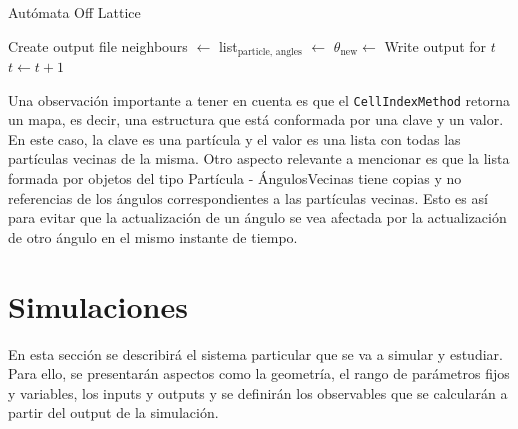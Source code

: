\documentclass[11pt, a4paper]{article}
\begin{document}
            \begin{algorithm}
                \caption{Autómata Off Lattice}
                \begin{algorithmic}[1]
                    \State Create output file
                        \State neighbours $\gets$ 
                        \State list$_{\text{particle, angles}}$ $\gets$ 
                            \State $\theta_{\text{new}} \gets$ 
                            \State {}
                            \State {}
                            \State {}
                            \State Write output for $t$
                        \EndFor
                        \State $t \gets t + 1$
                    \EndWhile
                \end{algorithmic}
                \label{alg:algorithm}
            \end{algorithm}

            Una observación importante a tener en cuenta es que el \texttt{CellIndexMethod} retorna un mapa, es decir, una estructura
            que está conformada por una clave y un valor.
            En este caso, la clave es una partícula y el valor es una lista con todas las partículas vecinas de la misma.
            Otro aspecto relevante a mencionar es que la lista formada por objetos del tipo Partícula - ÁngulosVecinas
            tiene copias y no referencias de los ángulos correspondientes a las partículas vecinas.
            Esto es así para evitar que la actualización de un ángulo se vea afectada por la actualización de otro
            ángulo en el mismo instante de tiempo.

    \newpage

    \section{Simulaciones}
    \label{sec:simulaciones}

        En esta sección se describirá el sistema particular que se va a simular y estudiar. Para ello, se
        presentarán aspectos como la geometría, el rango de parámetros fijos y variables, los inputs y outputs
        y se definirán los observables que se calcularán a partir del output de la simulación.
\end{document}
